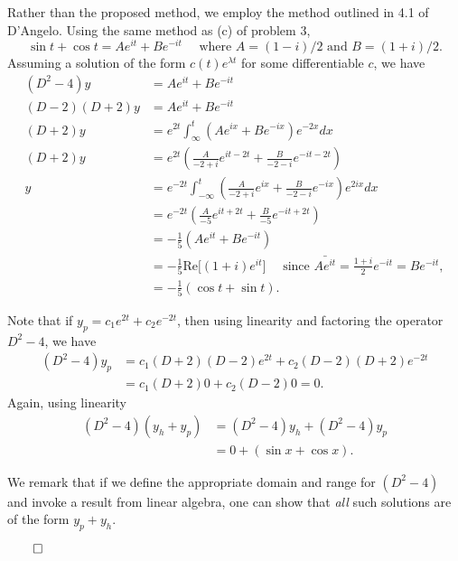 \documentclass{homework}
\begin{document}
Rather than the proposed method, we employ the method outlined in 4.1 of D'Angelo.  Using the same method as (c) of problem 3,  
$$
\sin t + \cos t = A e^{it} + Be^{-it}\quad\text{ where $A = (1-i)/2$ and $B = (1+i)/2$.}
$$
Assuming a solution of the form $c(t)e^{\lambda t}$ for some differentiable $c$, we have
\enlargethispage{1em}
\begin{align*}
  (D^2 - 4) y &= Ae^{it} + Be^{-it} \\
  (D - 2)(D+2) y&= Ae^{it} + Be^{-it} \\
  (D+2) y&= e^{2t}\int_{\infty}^t (Ae^{ix} + Be^{-ix})e^{-2x}dx\\
  (D+2) y&= e^{2t}\left(\frac{A}{-2+i}e^{it-2t} + \frac B{-2-i}e^{-it-2t}\right)\\
  y&= e^{-2t}\int_{-\infty}^t \left(\frac{A}{-2+i}e^{ix} + \frac B{-2-i} e^{-ix}\right) e^{2ix} dx\\
  &= e^{-2t}\left( \frac A{-5} e^{it+2t} + \frac{B}{-5}e^{-it + 2t} \right)\\
  &= -\frac {1}{5}\left( Ae^{it} + Be^{-it} \right)\\
  &= -\frac 15 \mathrm{Re}\big[ (1+i)e^{it} \big] \quad \text{ since }\bar{Ae^{it}} = \frac{1+i}2e^{-it} = Be^{-it},\\
  &= -\frac 15( \cos t + \sin t).
\end{align*}


Note that if $y_p = c_1 e^{2t} + c_2 e^{-2t}$, then using linearity and factoring the operator $D^2 -4$, we have
\begin{align*}
  (D^2 - 4)y_p 
  &= c_1(D+2)(D - 2)e^{2t} + c_2(D-2)(D + 2)e^{-2t} \\
  &= c_1(D+2) 0 + c_2(D-2) 0 = 0.
\end{align*}
Again, using linearity
\begin{align*}
  (D^2 - 4) (y_h + y_p) 
  &= (D^2 -4)y_h + (D^2 -4)y_p\\
  &= 0 + (\sin x + \cos x).
\end{align*}

We remark that if we define the appropriate domain and range for $(D^2 - 4)$ and invoke a result from linear algebra, one can show that \emph{all} such solutions are of the form $y_p + y_h$.

\raggedleft$\qed$
\end{document}
